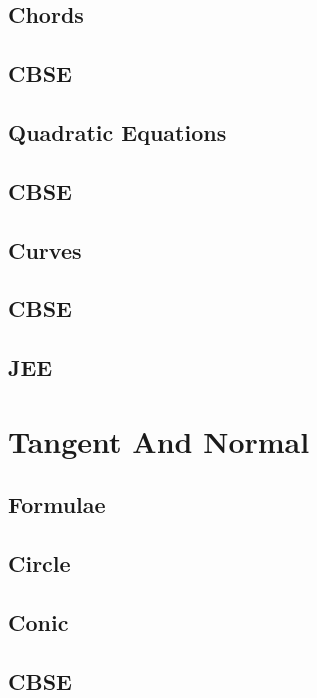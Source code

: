 \documentclass[journal]{IEEEtran}
\begin{document}
\subsection{Chords}

\subsection{CBSE}

\subsection{Quadratic Equations}

\subsection{CBSE}

\subsection{Curves}

\subsection{CBSE}

\subsection{JEE}
 

\newpage
\section{Tangent And Normal}
\subsection{Formulae}

\subsection{Circle}

\subsection{Conic}

\subsection{CBSE}

\end{document}
